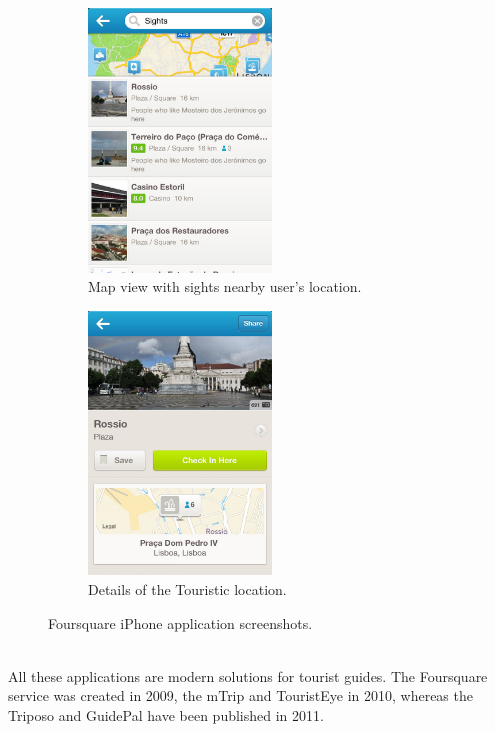 \begin{figure}
        \centering
        \begin{subfigure}[b]{0.25\textwidth}
                \centering
                \includegraphics[height=7cm]{./images/screenshots/screenshot_foursqure_1.jpg}
                \caption{Map view with sights nearby user's location.}
                \label{fig:4squre2}
        \end{subfigure}%
        \quad\quad\quad\quad\quad
        \begin{subfigure}[b]{0.25\textwidth}
                \centering
                \includegraphics[height=7cm]{./images/screenshots/screenshot_foursqure_2.jpg}
                \caption{Details of the Touristic location.}
                \label{fig:4squre3}
        \end{subfigure}%
        \caption{Foursquare iPhone application screenshots.}
        \label{fig:4SqureScreenshots}
\end{figure}
\\
All these applications are modern solutions for tourist guides. The Foursquare service was created in 2009, the mTrip and TouristEye in 2010, whereas the Triposo and GuidePal have been published in 2011. 
\newpage

